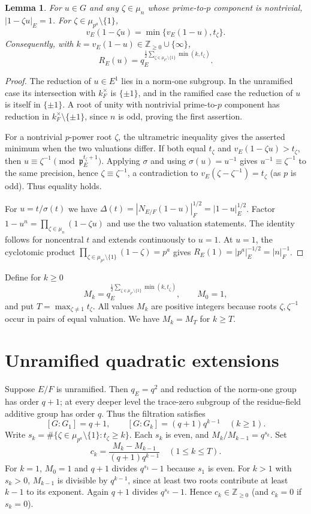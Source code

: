 \documentclass[11pt]{article}
\newtheorem{lemma}[theorem]{Lemma}
\newcommand{\Z}{\mathbb Z}
\newcommand{\1}{\mathbf 1}
\begin{document}
\begin{lemma}\label{lem:valuations}
For $u\in G$ and any $\zeta\in\mu_n$ whose prime-to-$p$ component is nontrivial, $|1-\zeta u|_E=1$. For $\zeta\in\mu_{p^a}\setminus\{1\}$,
\[
 v_E(1-\zeta u)=\min\{v_E(1-u),t_\zeta\}.
\]
Consequently, with $k=v_E(1-u)\in\Z_{\geq0}\cup\{\infty\}$,
\begin{equation}\label{eq:radial}
 R_E(u)=q_E^{\frac12\sum_{\zeta\in\mu_{p^a}\setminus\{1\}}\min(k,t_\zeta)}.
\end{equation}
\end{lemma}
\begin{proof}
The reduction of $u\in E^1$ lies in a norm-one subgroup. In the unramified case its intersection with $k_F^\times$ is $\{\pm1\}$, and in the ramified case the reduction of $u$ is itself in $\{\pm1\}$. A root of unity with nontrivial prime-to-$p$ component has reduction in $k_F^\times\setminus\{\pm1\}$, since $n$ is odd, proving the first assertion.

For a nontrivial $p$-power root $\zeta$, the ultrametric inequality gives the asserted minimum when the two valuations differ. If both equal $t_\zeta$ and $v_E(1-\zeta u)>t_\zeta$, then $u\equiv\zeta^{-1}\pmod{\mathfrak p_E^{t_\zeta+1}}$. Applying $\sigma$ and using $\sigma(u)=u^{-1}$ gives $u^{-1}\equiv\zeta^{-1}$ to the same precision, hence $\zeta\equiv\zeta^{-1}$, a contradiction to $v_E(\zeta-\zeta^{-1})=t_\zeta$ (as $p$ is odd). Thus equality holds.

For $u=t/\sigma(t)$ we have
$\Delta(t)=|N_{E/F}(1-u)|_F^{1/2}=|1-u|_E^{1/2}$.
Factor $1-u^n=\prod_{\zeta\in\mu_n}(1-\zeta u)$ and use the two valuation statements. The identity follows for noncentral $t$ and extends continuously to $u=1$. At $u=1$, the cyclotomic product $\prod_{\zeta\in\mu_{p^a}\setminus\{1\}}(1-\zeta)=p^a$ gives $R_E(1)=|p^a|_E^{-1/2}=|n|_F^{-1}$.
\end{proof}

Define for $k\geq0$
\[
 M_k=q_E^{\frac12\sum_{\zeta\in\mu_{p^a}\setminus\{1\}}\min(k,t_\zeta)},\qquad M_0=1,
\]
and put $T=\max_{\zeta\ne1}t_\zeta$. All values $M_k$ are positive integers because roots $\zeta,\zeta^{-1}$ occur in pairs of equal valuation. We have $M_k=M_T$ for $k\geq T$.

\section{Unramified quadratic extensions}
Suppose $E/F$ is unramified. Then $q_E=q^2$ and reduction of the norm-one group has order $q+1$; at every deeper level the trace-zero subgroup of the residue-field additive group has order $q$. Thus the filtration satisfies
\[
 [G:G_1]=q+1,\qquad [G:G_k]=(q+1)q^{k-1}\quad(k\geq1).
\]
Write $s_k=\#\{\zeta\in\mu_{p^a}\setminus\{1\}:t_\zeta\geq k\}$. Each $s_k$ is even, and $M_k/M_{k-1}=q^{s_k}$.
Set
\[
 c_k=\frac{M_k-M_{k-1}}{(q+1)q^{k-1}}\quad(1\leq k\leq T).
\]
For $k=1$, $M_0=1$ and $q+1$ divides $q^{s_1}-1$ because $s_1$ is even. For $k>1$ with $s_k>0$, $M_{k-1}$ is divisible by $q^{k-1}$, since at least two roots contribute at least $k-1$ to its exponent. Again $q+1$ divides $q^{s_k}-1$. Hence $c_k\in\Z_{\geq0}$ (and $c_k=0$ if $s_k=0$).
\end{document}
